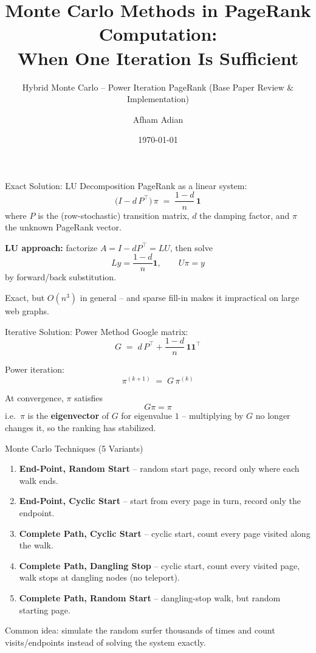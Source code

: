 \documentclass[aspectratio=169]{beamer}
\title[Hybrid MC--Power PageRank]{Monte Carlo Methods in PageRank Computation:\\
When One Iteration Is Sufficient}
\subtitle{Hybrid Monte Carlo -- Power Iteration PageRank (Base Paper Review \& Implementation)}
\author{Afham Adian}
\date{\today}
\begin{document}
\begin{frame}
  \titlepage
\end{frame}

\begin{frame}{Exact Solution: LU Decomposition}
  PageRank as a linear system:
  \[
    \bigl(I - d\,P^{\top}\bigr)\,\pi \;=\; \frac{1-d}{n}\,\mathbf{1}
  \]
  where $P$ is the (row-stochastic) transition matrix, $d$ the damping
  factor, and $\pi$ the unknown PageRank vector.

  \vspace{0.5cm}
  \textbf{LU approach:} factorize $A = I - dP^{\top} = LU$, then solve
  \[
    Ly = \frac{1-d}{n}\mathbf{1}, \qquad U\pi = y
  \]
  by forward/back substitution.

  \vspace{0.3cm}
  Exact, but $O(n^3)$ in general -- and sparse fill-in makes it
  impractical on large web graphs.
\end{frame}

\begin{frame}{Iterative Solution: Power Method}
  Google matrix:
  \[
    G \;=\; d\,P^{\top} + \frac{1-d}{n}\,\mathbf{1}\mathbf{1}^{\top}
  \]

  Power iteration:
  \[
    \pi^{(k+1)} \;=\; G\,\pi^{(k)}
  \]

  \vspace{0.4cm}
  At convergence, $\pi$ satisfies
  \[
    G\pi = \pi
  \]
  i.e.\ $\pi$ is the \textbf{eigenvector} of $G$ for eigenvalue $1$ --
  multiplying by $G$ no longer changes it, so the ranking has stabilized.
\end{frame}

\begin{frame}{Monte Carlo Techniques (5 Variants)}
  \small
  \begin{enumerate}
    \item \textbf{End-Point, Random Start} -- random start page, record only
      where each walk ends.
    \item \textbf{End-Point, Cyclic Start} -- start from every page in turn,
      record only the endpoint.
    \item \textbf{Complete Path, Cyclic Start} -- cyclic start, count every
      page visited along the walk.
    \item \textbf{Complete Path, Dangling Stop} -- cyclic start, count every
      visited page, walk stops at dangling nodes (no teleport).
    \item \textbf{Complete Path, Random Start} -- dangling-stop walk, but
      random starting page.
  \end{enumerate}
  \vspace{0.3cm}
  Common idea: simulate the random surfer thousands of times and count
  visits/endpoints instead of solving the system exactly.
\end{frame}
\end{document}
